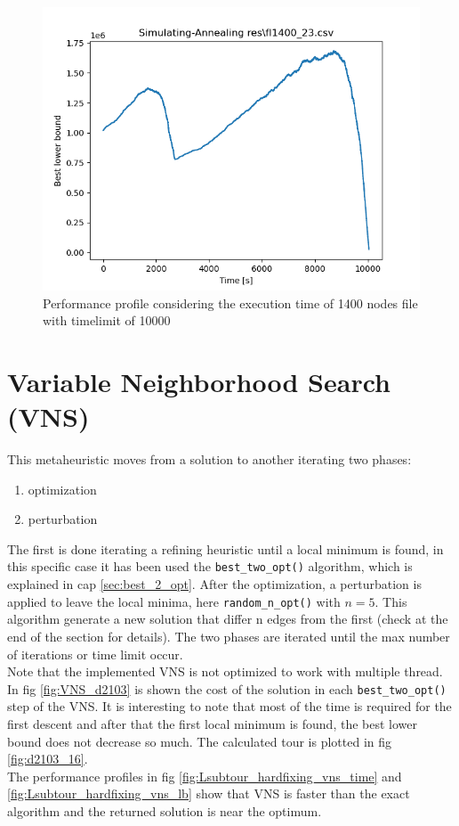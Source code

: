 \begin{figure}[h]
	\centering
	\includegraphics[width=.6\columnwidth]{../res/fl1400_23.png}
	\caption{Performance profile considering the execution time of 1400 nodes file with timelimit of 10000}
	\label{fig:simultaing_annealing_perform_time}
\end{figure}

\section{Variable Neighborhood Search (VNS)}
This metaheuristic moves from a solution to another iterating two phases:
\begin{enumerate}
	\item optimization
	\item perturbation
\end{enumerate}
The first is done iterating a refining heuristic until a local minimum is found, in this specific case it has been used the \texttt{best\_two\_opt()} algorithm, which is explained in cap \ref{sec:best_2_opt}. After the optimization, a perturbation is applied to leave the local minima, here \texttt{random\_n\_opt()} with $ n=5 $. This algorithm generate a new solution that differ n edges from the first (check at the end of the section for details).
The two phases are iterated until the max number of iterations or time limit occur.\\
Note that the implemented VNS is not optimized to work with multiple thread.\\
In fig \ref{fig:VNS_d2103} is shown the cost of the solution in each \texttt{best\_two\_opt()} step of the VNS. It is interesting to note that most of the time is required for the first descent and after that the first local minimum is found, the best lower bound does not decrease so much.
The calculated tour is plotted in fig \ref{fig:d2103_16}.\\
The performance profiles in fig \ref{fig:Lsubtour_hardfixing_vns_time} and \ref{fig:Lsubtour_hardfixing_vns_lb} show that VNS is faster than the exact algorithm and the returned solution is near the optimum.

